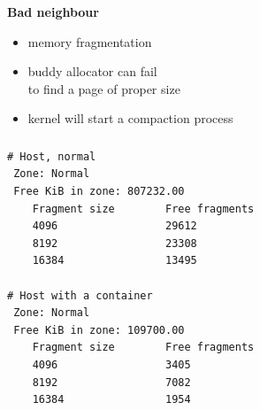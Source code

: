 \documentclass[usenames,dvipsnames, 18pt, compress, aspectratio=169]{beamer}
\begin{document}



\begin{frame}
    \frametitle{}
    \begin{center}
    \textbf{Bad neighbour}

        \begin{itemize}[label={\MVRightarrow}]
            \item memory fragmentation
            \item buddy allocator can fail \\ to find a page of proper size
            \item kernel will start a compaction process
        \end{itemize}

    \end{center}
\end{frame}

\begin{frame}[fragile]{}
    \frametitle{}
    \begin{center}

        \begin{verbatim}
# Host, normal
 Zone: Normal
 Free KiB in zone: 807232.00
    Fragment size        Free fragments
    4096                 29612
    8192                 23308
    16384                13495

# Host with a container
 Zone: Normal
 Free KiB in zone: 109700.00
    Fragment size        Free fragments
    4096                 3405
    8192                 7082
    16384                1954
        \end{verbatim}

    \end{center}
\end{frame}
\end{document}
